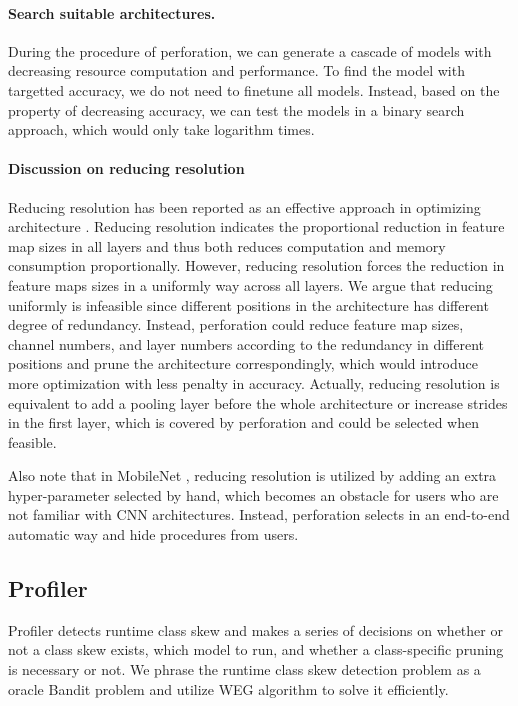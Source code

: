 \documentclass[pageno]{jpaper}
\begin{document}

\paragraph{Search suitable architectures.}
During the procedure of perforation, we can generate a cascade of models with decreasing resource computation and performance. To find the model with targetted accuracy, we do not need to finetune all models. Instead, based on the property of decreasing accuracy, we can test the models in a binary search approach, which would only take logarithm times.

\paragraph{Discussion on reducing resolution}
Reducing resolution has been reported as an effective approach in optimizing architecture \cite{krizhevsky2009learning, fu2017look, howard2017mobilenets}. Reducing resolution indicates the proportional reduction in feature map sizes in all layers and thus both reduces computation and memory consumption proportionally. However, reducing resolution forces the reduction in feature maps sizes in a uniformly way across all layers. We argue that reducing uniformly is infeasible since different positions in the architecture has different degree of redundancy. Instead, perforation could reduce feature map sizes, channel numbers, and layer numbers according to the redundancy in different positions and prune the architecture correspondingly, which would introduce more optimization with less penalty in accuracy. Actually, reducing resolution is equivalent to add a pooling layer before the whole architecture or increase strides in the first layer, which is covered by perforation and could be selected when feasible.

Also note that in MobileNet \cite{howard2017mobilenets}, reducing resolution is utilized by adding an extra hyper-parameter selected by hand, which becomes an obstacle for users who are not familiar with CNN architectures. Instead, perforation selects in an end-to-end automatic way and hide procedures from users.



\subsection{Profiler} \label{profilerSection}
Profiler detects runtime class skew and makes a series of decisions on whether or not a class skew exists, which model to run, and whether a class-specific pruning is necessary or not. We phrase the runtime class skew detection problem as a oracle Bandit problem \cite{auer2002finite, lai1985asymptotically} and utilize WEG algorithm \cite{shen2016fast} to solve it efficiently.
\end{document}
